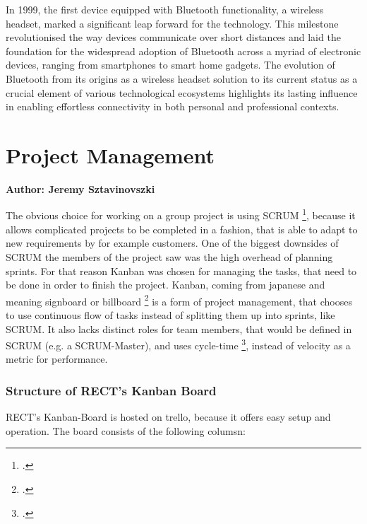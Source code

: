 In 1999, the first device equipped with Bluetooth functionality, a wireless headset, marked a significant leap forward for the technology. This milestone 
revolutionised the way devices communicate over short distances and laid the foundation for the widespread adoption of Bluetooth across a myriad of electronic 
devices, ranging from smartphones to smart home gadgets. The evolution of Bluetooth from its origins as a wireless headset solution to its current status as a 
crucial element of various technological ecosystems highlights its lasting influence in enabling effortless connectivity in both personal and professional contexts.

\section{Project Management}
\textbf{Author: Jeremy Sztavinovszki}


The obvious choice for working on a group project is using SCRUM \footcite{what-is-scrum}, because it allows complicated projects to be completed in a fashion, 
that is able to adapt to new requirements by for example customers. One of the biggest downsides of SCRUM the members of the project saw was the high overhead of planning sprints. 
For that reason Kanban was chosen for managing the tasks, that need to be done in order to finish the project. Kanban, coming from japanese and meaning signboard or billboard 
\footcite{what-is-kanban} is a form of project management, that chooses to use continuous flow of tasks instead of splitting them up into sprints, like SCRUM. 
It also lacks distinct roles for team members, that would be defined in SCRUM (e.g. a SCRUM-Master), and uses cycle-time \footcite{cycle-time-lead-time},
instead of velocity as a metric for performance. 

\subsubsection{Structure of RECT's Kanban Board}
RECT's Kanban-Board is hosted on trello, because it offers easy setup and operation. The board consists of the following columsn:

